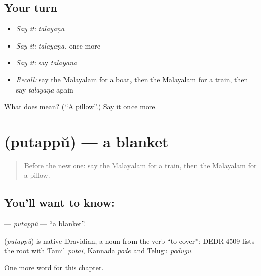 \subsection*{Your turn}
\begin{itemize}
\raggedright
  \item \emph{Say it:} \emph{talayaṇa}
  \item \emph{Say it:} \emph{talayaṇa}, once more
  \item \emph{Say it:} say \emph{talayaṇa}
  \item \emph{Recall:} say the Malayalam for a boat, then the Malayalam for a train, then say \emph{talayaṇa} again
\end{itemize}

\begin{tcolorbox}[breakable,colback=teal!4,colframe=teal!35!black,title={Before you move on}]
What does  mean? (\textquotedblleft{}A pillow\textquotedblright{}.) Say it once more.
\end{tcolorbox}
\section[\texorpdfstring{\ml{പുതപ്പ്} (putappŭ)}{പുതപ്പ് (putappŭ)}]{ (putappŭ) — a blanket}

\label{lesson:ML-C158-putappu}



\begin{quote}
Before the new one: say the Malayalam for a train, then the Malayalam for a pillow.
\end{quote}

\subsection*{You'll want to know: }
\textbf{} — \emph{putappŭ} — \textquotedblleft{}a blanket\textquotedblright{}.

\begin{cousinweb}
\textbf{} (\emph{putappŭ}) is native Dravidian, a noun from the verb \textquotedblleft{}to cover\textquotedblright{}; DEDR 4509 lists the root with Tamil \emph{putai}, Kannada \emph{pode} and Telugu \emph{podugu}.
\end{cousinweb}

\begin{grammarlens}[title={What you've built}]
One more word for this chapter.
\end{grammarlens}

